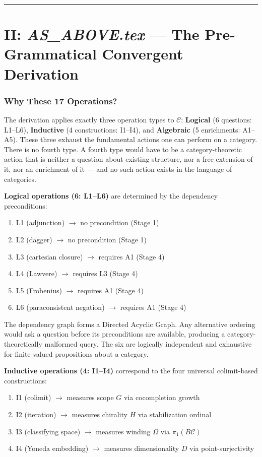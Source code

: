 \documentclass[12pt,a4paper]{article}
\begin{document}
\begin{center}
\rule{0.5\textwidth}{0.4pt}
\end{center}

\part{II: \textit{AS\_ABOVE.tex} --- The Pre-Grammatical Convergent Derivation}
\label{part:ii}

\section{Why These 17 Operations?}

The derivation applies exactly three operation types to $\mathcal{C}$: \textbf{Logical} (6 questions: L1--L6), \textbf{Inductive} (4 constructions: I1--I4), and \textbf{Algebraic} (5 enrichments: A1--A5). These three exhaust the fundamental actions one can perform on a category. There is no fourth type. A fourth type would have to be a category-theoretic action that is neither a question about existing structure, nor a free extension of it, nor an enrichment of it --- and no such action exists in the language of categories.

\textbf{Logical operations (6: L1--L6)} are determined by the dependency preconditions:
\begin{enumerate}
    \item L1 (adjunction) $\to$ no precondition (Stage 1)
    \item L2 (dagger) $\to$ no precondition (Stage 1)
    \item L3 (cartesian closure) $\to$ requires A1 (Stage 4)
    \item L4 (Lawvere) $\to$ requires L3 (Stage 4)
    \item L5 (Frobenius) $\to$ requires A1 (Stage 4)
    \item L6 (paraconsistent negation) $\to$ requires A1 (Stage 4)
\end{enumerate}

The dependency graph forms a Directed Acyclic Graph. Any alternative ordering would ask a question before its preconditions are available, producing a category-theoretically malformed query. The six are logically independent and exhaustive for finite-valued propositions about a category.

\textbf{Inductive operations (4: I1--I4)} correspond to the four universal colimit-based constructions:
\begin{enumerate}
    \item I1 (colimit) $\to$ measures scope $G$ via cocompletion growth
    \item I2 (iteration) $\to$ measures chirality $H$ via stabilization ordinal
    \item I3 (classifying space) $\to$ measures winding $\Omega$ via $\pi_1(B\mathcal{C})$
    \item I4 (Yoneda embedding) $\to$ measures dimensionality $D$ via point-surjectivity
\end{enumerate}
\end{document}
